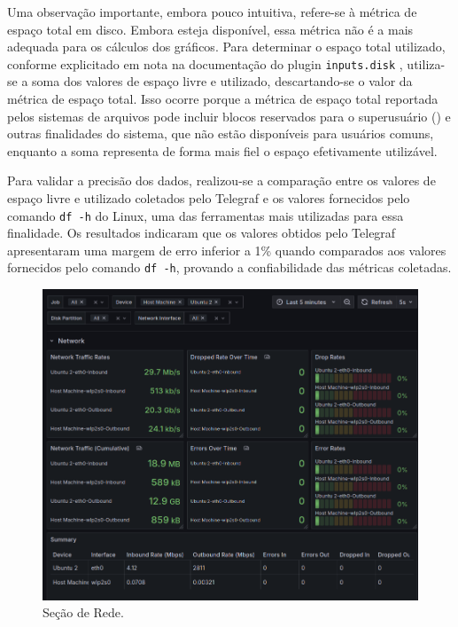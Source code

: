 Uma observação importante, embora pouco intuitiva, refere-se à métrica de espaço total em disco. Embora esteja disponível, essa métrica não é a mais adequada para os cálculos dos gráficos. Para determinar o espaço total utilizado, conforme explicitado em nota na documentação do plugin \verb|inputs.disk| \citep{inputsdisk2025}, utiliza-se a soma dos valores de espaço livre e utilizado, descartando-se o valor da métrica de espaço total. Isso ocorre porque a métrica de espaço total reportada pelos sistemas de arquivos pode incluir blocos reservados para o superusuário () e outras finalidades do sistema, que não estão disponíveis para usuários comuns, enquanto a soma  representa de forma mais fiel o espaço efetivamente utilizável.

Para validar a precisão dos dados, realizou-se a comparação entre os valores de espaço livre e utilizado coletados pelo Telegraf e os valores fornecidos pelo comando \verb|df -h| do Linux, uma das ferramentas mais utilizadas para essa finalidade. Os resultados indicaram que os valores obtidos pelo Telegraf apresentaram uma margem de erro inferior a 1\% quando comparados aos valores fornecidos pelo comando \verb|df -h|, provando a confiabilidade das métricas coletadas.

\begin{figure}[H]
\centering
\setlength{\abovecaptionskip}{-20pt}
\includegraphics[width=\textwidth]{Imagens/chap04/dashboard/network.png}
\caption{Seção de Rede.}
\label{fig:dashboard-network}
\end{figure}

